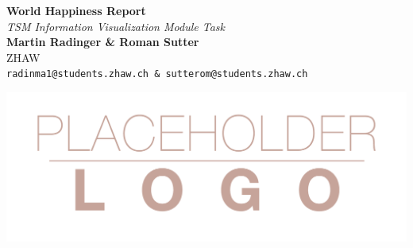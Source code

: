 \documentclass[a0,portrait]{a0poster}
\begin{document}


\begin{minipage}[b]{0.75\linewidth}
\veryHuge \color{NavyBlue} \textbf{World Happiness Report} \color{Black}\\ %
\Huge\textit{TSM Information Visualization Module Task}\\[2cm] %
\huge \textbf{Martin Radinger \& Roman Sutter}\\[0.5cm] %
\huge ZHAW \\[0.4cm] %
\Large \texttt{radinma1@students.zhaw.ch \& sutterom@students.zhaw.ch}\\
\end{minipage}
%
\begin{minipage}[b]{0.25\linewidth}
\includegraphics[width=20cm]{logo.png}\\
\end{minipage}

\vspace{1cm} %

\end{document}
